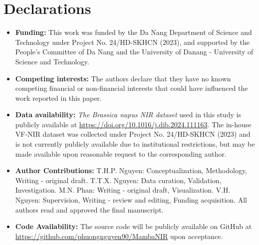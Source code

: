 \documentclass[pdflatex,sn-mathphys-num]{sn-jnl}%
\begin{document}
\section*{Declarations}
\begin{itemize}
    \item \textbf{Funding:} This work was funded by the Da Nang Department of Science and Technology under Project No. 24/HD-SKHCN (2023), and supported by the People's Committee of Da Nang and the University of Danang - University of Science and Technology. 
    \item \textbf{Competing interests:} The authors declare that they have no known competing financial or non-financial interests that could have influenced the work reported in this paper.
    \item \textbf{Data availability:} \emph{The Brassica napus NIR dataset} used in this study is publicly available at \url{https://doi.org/10.1016/j.dib.2024.111163}. The in-house VF-NIR dataset was collected under Project No. 24/HD-SKHCN (2023) and is not currently publicly available due to institutional restrictions, but may be made available upon reasonable request to the corresponding author.
    \item \textbf{Author Contributions:} T.H.P. Nguyen: Conceptualization, Methodology, Writing - original draft. T.T.X. Nguyen: Data curation, Validation, Investigation. M.N. Phan: Writing - original draft, Visualization. V.H. Nguyen: Supervision, Writing - review and editing, Funding acquisition. All authors read and approved the final manuscript.
    \item \textbf{Code Availability:} The source code will be publicly available on GitHub at \url{https://github.com/phuongnguyen90/MambaNIR} upon acceptance.
\end{itemize}



\backmatter
\end{document}
